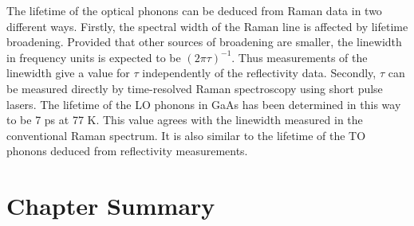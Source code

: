 \documentclass[12pt]{book}
\begin{document}
The lifetime of the optical phonons can be deduced from Raman data in two different ways. Firstly, the spectral width of the Raman line is affected by lifetime broadening. Provided that other sources of broadening are smaller, the linewidth in frequency units is expected to be $(2\pi\tau)^{-1}$. Thus measurements of the linewidth give a value for $\tau$ independently of the reflectivity data. Secondly, $\tau$ can be measured directly by time-resolved Raman spectroscopy using short pulse lasers. The lifetime of the LO phonons in GaAs has been determined in this way to be 7 ps at 77 K. This value agrees with the linewidth measured in the conventional Raman spectrum. It is also similar to the lifetime of the TO phonons deduced from reflectivity measurements.

\section*{Chapter Summary}
\end{document}

